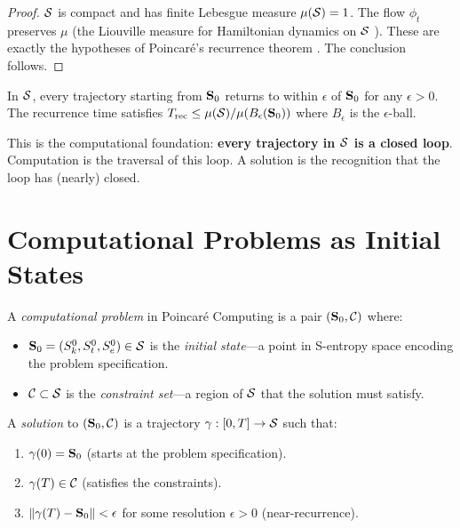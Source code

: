 \begin{proof}
$\mathcal{S}$ is compact and has finite Lebesgue measure $\mu(\mathcal{S}) = 1$. The flow $\phi_t$ preserves $\mu$ (the Liouville measure for Hamiltonian dynamics on $\mathcal{S}$ \cite{liouville1838}). These are exactly the hypotheses of Poincar\'{e}'s recurrence theorem \cite{poincare1890}. The conclusion follows.
\end{proof}

\begin{corollary}
\label{cor:returns}
In $\mathcal{S}$, every trajectory starting from $\mathbf{S}_0$ returns to within $\epsilon$ of $\mathbf{S}_0$ for any $\epsilon > 0$. The recurrence time satisfies $T_{\mathrm{rec}} \leq \mu(\mathcal{S})/\mu(B_\epsilon(\mathbf{S}_0))$ where $B_\epsilon$ is the $\epsilon$-ball.
\end{corollary}

This is the computational foundation: \textbf{every trajectory in $\mathcal{S}$ is a closed loop}. Computation is the traversal of this loop. A solution is the recognition that the loop has (nearly) closed.

\section{Computational Problems as Initial States}
\label{sec:problems}

\begin{definition}
\label{def:problem}
A \emph{computational problem} in Poincar\'{e} Computing is a pair $(\mathbf{S}_0, \mathcal{C})$ where:
\begin{itemize}
    \item $\mathbf{S}_0 = (S_k^0, S_t^0, S_e^0) \in \mathcal{S}$ is the \emph{initial state}---a point in S-entropy space encoding the problem specification.
    \item $\mathcal{C} \subset \mathcal{S}$ is the \emph{constraint set}---a region of $\mathcal{S}$ that the solution must satisfy.
\end{itemize}
\end{definition}

\begin{definition}[Solution]
\label{def:solution}
A \emph{solution} to $(\mathbf{S}_0, \mathcal{C})$ is a trajectory $\gamma : [0, T] \to \mathcal{S}$ such that:
\begin{enumerate}
    \item $\gamma(0) = \mathbf{S}_0$ (starts at the problem specification).
    \item $\gamma(T) \in \mathcal{C}$ (satisfies the constraints).
    \item $\|\gamma(T) - \mathbf{S}_0\| < \epsilon$ for some resolution $\epsilon > 0$ (near-recurrence).
\end{enumerate}
\end{definition}

